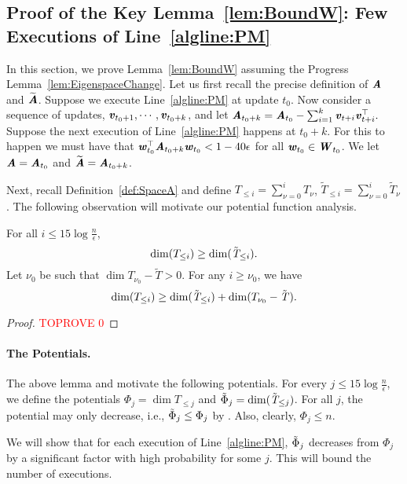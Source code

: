 

\subsection{Proof of the Key Lemma~\ref{lem:BoundW}: Few Executions of Line~\ref{algline:PM}}

\label{sec:proof key}

In this section, we prove Lemma~\ref{lem:BoundW} assuming the Progress Lemma~\ref{lem:EigenspaceChange}. 
%
Let us first recall the precise definition of $\AA$ and $\AAtil$. Suppose we execute Line~\ref{algline:PM} at update $t_{0}$. Now consider a sequence of updates, $\vv_{t_{0}+1},\cdots,\vv_{t_{0}+k}$, and let $\AA_{t_{0}+k}=\AA_{t_{0}}-\sum_{i=1}^{k}\vv_{t+i}\vv_{t+i}^{\top}.$ Suppose the next execution of Line~\ref{algline:PM} happens at $t_{0}+k$. For this to happen we must have that $\ww_{t_{0}}^{\top}\AA_{t_{0}+k}\ww_{t_{0}}<1-40\epsilon$ for all $\ww_{t_{0}}\in\WW_{t_{0}}$. We let $\AA=\AA_{t_{0}}$ and $\AAtil=\AA_{t_{0}+k}$. 

Next, recall Definition~\ref{def:SpaceA} and define $T_{\leq i}=\sum_{\nu=0}^{i}T_{\nu}$, $\tilde{T}_{\leq i}=\sum_{\nu=0}^{i}\tilde{T}_{\nu}$. The following observation will motivate our potential function analysis.
\begin{lemma}
	\label{lem:Monotone} For all $i\leq15\log\frac{n}{\epsilon}$, 
	\[
	\dim{T_{\le i}}\ge\dim{\Ttil_{\le i}}.
	\]
	Let $\nu_{0}$ be such that $\dim{T_{\nu_{0}}-\tilde{T}}>0$. For any $i\ge\nu_{0}$, we have
	\[
	\dim{T_{\le i}}\geq\dim{\Ttil_{\le i}}+\dim{T_{\nu_{0}}-\Ttil}.
	\]
	
\end{lemma}

\begin{proof}\textcolor{red}{TOPROVE 0}\end{proof}

\paragraph{The Potentials.}
The above lemma and  motivate the following potentials.
For every $j\le15\log\frac{n}{\epsilon}$, we define the potentials $\Phi_{j}=\dim{T_{\le j}}$ and $\tilde{\Phi}_{j}=\dim{\Ttil_{\le j}}$. For all $j$, the potential may only decrease, i.e., $\Phitil_{j}\le\Phi_{j}$ by . Also, clearly, $\Phi_{j}\le n$. 

We will show that for each execution of Line~\ref{algline:PM}, $\Phitil_{j}$ decreases from $\Phi_j$ by a significant factor with high probability for some $j$. This will bound the number of executions.

